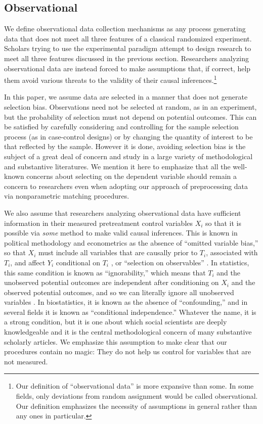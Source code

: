 \documentclass[11pt,titlepage]{article}
\begin{document}
\subsection{Observational}

We define observational data collection mechanisms as any process
generating data that does not meet all three features of a classical
randomized experiment.  Scholars trying to use the experimental
paradigm attempt to design research to meet all three features
discussed in the previous section.  Researchers analyzing
observational data are instead forced to make assumptions that, if
correct, help them avoid various threats to the validity of their
causal inferences.\footnote{Our definition of ``observational data''
  is more expansive than some.  In some fields, only deviations from
  random assignment would be called observational.  Our definition
  emphasizes the necessity of assumptions in general rather than any
  ones in particular.}

In this paper, we assume data are selected in a manner that does not
generate selection bias.  Observations need not be selected at random,
as in an experiment, but the probability of selection must not depend
on potential outcomes.  This can be satisfied by carefully considering
and controlling for the sample selection process (as in case-control
designs) or by changing the quantity of interest to be that reflected
by the sample.  However it is done, avoiding selection bias is the
subject of a great deal of concern and study in a large variety of
methodological and substantive literatures.  We mention it here to
emphasize that all the well-known concerns about selecting on the
dependent variable should remain a concern to researchers even when
adopting our approach of preprocessing data via nonparametric matching
procedures.

We also assume that researchers analyzing observational data have
sufficient information in their measured pretreatment control
variables $X_i$ so that it is possible via \emph{some} method to make
valid causal inferences.  This is known in political methodology and
econometrics as the absence of ``omitted variable bias,'' so that
$X_i$ must include all variables that are causally prior to $T_i$,
associated with $T_i$, and affect $Y_i$ conditional on $T_i$
\citep{Goldberger91,KinKeoVer94}, or ``selection on observables''
\citep{HecRob85}.  In statistics, this same condition is known as
``ignorability,'' which means that $T_i$ and the unobserved potential
outcomes are independent after conditioning on $X_i$ and the observed
potential outcomes, and so we can literally ignore all unobserved
variables \citep{Rubin78}.  In biostatistics, it is known as the
absence of ``confounding,'' and in several fields it is known as
``conditional independence.''  Whatever the name, it is a strong
condition, but it is one about which social scientists are deeply
knowledgeable and it is the central methodological concern of many
substantive scholarly articles.  We emphasize this assumption to make
clear that our procedures contain no magic: They do not help us
control for variables that are not measured.
\end{document}
